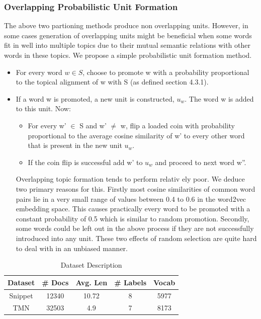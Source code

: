 \documentclass{sig-alternate-05-2015}
\begin{document}
\subsubsection{Overlapping Probabilistic Unit Formation}
The above two partioning methods produce non overlapping units. However, in some cases generation of overlapping units might be beneficial when some words fit in well into multiple topics due to their mutual semantic relations with other words in these topics. We propose a simple probabilistic unit formation method.
\begin{itemize}
\item[] For every word $w \in S$, choose to promote w with a probability proportional to the topical alignment of w with S (as defined section 4.3.1). 
\item If a word w is promoted, a new unit is constructed, $u_{w}$. The word w is added to this unit. Now: \begin{itemize}
\item For every w' $\in$ S and w' $\neq$ w, flip a loaded coin with probability proportional to the average cosine similarity of w' to every other word that is present in the new unit $u_{w}$.
\item If the coin flip is successful add w' to $u_{w}$ and proceed to next word w''.
\end{itemize}
Overlapping topic formation tends to perform relativ ely poor. We deduce two primary reasons for this. Firstly most cosine similarities of common word pairs lie in a very small range of values between 0.4 to 0.6 in the word2vec embedding space. This causes practically every word to be promoted with a constant probability of 0.5 which is similar to random promotion. Secondly, some words could be left out in the above process if they are not successfully introduced into any unit. These two effects of random selection are quite hard to deal with in an unbiased manner.
\end{itemize}
\begin{center}
\begin{table}[t]
\label{ta1}
\begin{tabular}{c|cccc}
\hline
Dataset & \# Docs & Avg. Len & \# Labels & Vocab\\
\hline
Snippet & 12340 & 10.72 & 8 & 5977\\
\hline
 TMN & 32503 & 4.9 & 7 & 8173\\
\hline
\end{tabular}
\caption{Dataset Description}
\end{table}
\end{center}
\end{document}
